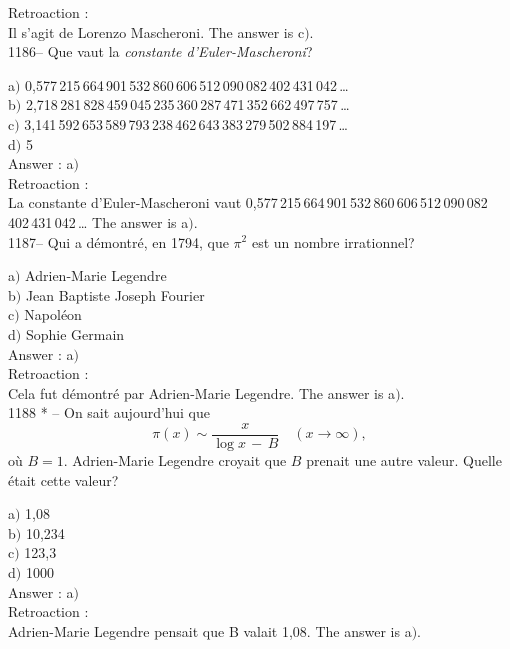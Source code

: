 ﻿\documentclass[letterpaper, 12pt]{article}
\begin{document}
Retroaction : \\
Il s'agit de Lorenzo Mascheroni.
The answer is c$)$.\\

1186-- Que vaut la {\sl constante d'Euler-Mascheroni}?

a$)$
0,577\,215\,664\,901\,532\,860\,606\,512\,090\,082\,402\,431\,042\,\ldots \\
b$)$
2,718\,281\,828\,459\,045\,235\,360\,287\,471\,352\,662\,497\,757\,\ldots \\
c$)$
3,141\,592\,653\,589\,793\,238\,462\,643\,383\,279\,502\,884\,197\,\ldots \\
d$)$ 5\\

Answer : a$)$\\

Retroaction : \\
La constante d'Euler-Mascheroni vaut
0,577\,215\,664\,901\,532\,860\,606\,512\,090\,082\,402\,431\,042\,\ldots
The answer is a$)$.\\

1187-- Qui a d\'emontr\'e, en 1794, que $\pi^2$ est un nombre
irrationnel?

a$)$ Adrien-Marie Legendre \\
b$)$ Jean Baptiste Joseph Fourier \\
c$)$ Napol\'eon \\
d$)$ Sophie Germain\\

Answer : a$)$\\

Retroaction : \\
Cela fut d\'emontr\'e par Adrien-Marie Legendre.
The answer is a$)$.\\

1188 * -- On sait aujourd'hui que
$$\pi(x)\sim\displaystyle\frac x{\log x\,-\,B}\quad(x\to\infty),$$
o\`u $B=1$. Adrien-Marie Legendre croyait que $B$ prenait une autre
valeur. Quelle \'etait cette valeur?

a$)$ 1,08 \\
b$)$ 10,234 \\
c$)$ 123,3 \\
d$)$ 1000\\

Answer : a$)$\\

Retroaction : \\
Adrien-Marie Legendre pensait que B valait 1,08.
The answer is a$)$.\\
\end{document}
